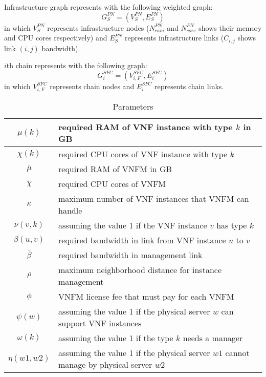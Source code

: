 \par
Infrastructure graph represents with the following weighted graph:
\[
G_S^{PN} = (V_S^{PN}, E_S^{PN})
\]
in which
\(V_S^{PN}\) represents infrastructure nodes (\(N_{ram}^{PN}\) and \(N_{core}^{PN}\) shows their memory and CPU cores respectively) and
\(E_S^{PN}\) represents infrastructure links (\(C_{i,j}\) shows link \((i, j)\) bandwidth).

\par
\(i\)th chain represents with the following graph:
\[
G^{SFC}_i = (V^{SFC}_{i, F}, E^{SFC}_i)
\]
in which
\(V^{SFC}_{i, F}\) represents chain nodes and
\(E^{SFC}_{i}\) represents chain links.

\begin{table}[H]
    \caption{Parameters}
    \label{tbl:parameters}
    \begin{center}\begin{tabular}{|c|p{}|}
    \hline
    \(\mu(k)\) & required RAM of VNF instance with type \(k\) in GB \\
    \hline
    \(\chi(k)\) & required CPU cores of VNF instance with type \(k\) \\
    \hline
    \(\bar\mu\) & required RAM of VNFM in GB \\
    \hline
    \(\bar\chi\) & required CPU cores of VNFM \\
    \hline
    \(\kappa\) & maximum number of VNF instances that VNFM can handle \\
    \hline
    \(\nu(v, k)\) & assuming the value 1 if the VNF instance \(v\) has type \(k\)  \\
    \hline
    \(\beta(u, v)\) & required bandwidth in link from VNF instance \(u\) to \(v\) \\
    \hline
    \(\bar{\beta}\) & required bandwidth in management link \\
    \hline
    \(\rho\) & maximum neighborhood distance for instance management \\
    \hline
    \(\phi\) & VNFM license fee that must pay for each VNFM \\
    \hline
    \(\psi(w)\) & assuming the value 1 if the physical server \(w\) can support VNF instances \\
    \hline
    \(\omega(k)\) & assuming the value 1 if the type \(k\) needs a manager \\
    \hline
    \(\eta(w1, w2)\) & assuming the value 1 if the physical server \(w1\) cannot manage by physical server \(w2\) \\
    \hline
    \end{tabular}\end{center}
\end{table}

